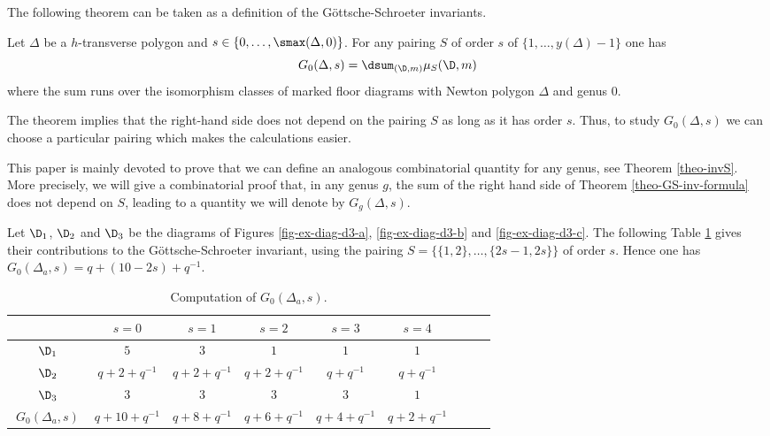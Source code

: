 The following theorem can be taken as a definition of the Göttsche-Schroeter invariants.

\begin{theo}\label{theo-GS-inv-formula}
Let $\Delta$ be a $h$-transverse polygon and $s\in \{0,\dots,\smax(\Delta,0)\}$. For any pairing $S$ of order $s$ of $\{1,\dots, y(\Delta)-1 \}$ one has
\[ G_0(\Delta,s) = \dsum_{(\D,m)} \mu_S(\D,m)  \]
where the sum runs over the isomorphism classes of marked floor diagrams with Newton polygon $\Delta$ and genus $0$.
\end{theo}

\begin{rema}
The theorem implies that the right-hand side does not depend on the pairing $S$ as long as it has order $s$. Thus, to study $G_0(\Delta,s)$ we can choose a particular pairing which makes the calculations easier.

This paper is mainly devoted to prove that we can define an analogous combinatorial quantity for any genus, see Theorem \ref{theo-invS}. More precisely, we will give a combinatorial proof that, in any genus $g$, the sum of the right hand side of Theorem \ref{theo-GS-inv-formula} does not depend on $S$, leading to a quantity we will denote by $G_g(\Delta,s)$.
\end{rema}


\begin{exam} \label{ex-calcul-G0-Delta3}
    Let $\D_1$, $\D_2$ and $\D_3$ be the diagrams of Figures \ref{fig-ex-diag-d3-a}, \ref{fig-ex-diag-d3-b} and \ref{fig-ex-diag-d3-c}. The following Table \ref{table-ex-refined-inv} gives their contributions to the Göttsche-Schroeter invariant, using the pairing $S = \{\{1,2\},\dots,\{2s-1,2s\}\}$ of order $s$. Hence one has $G_0(\Delta_a,s) = q+(10-2s)+q^{-1}$.

\begin{table}[ht]
\renewcommand{\arraystretch}{1.5}
\centering
\begin{tabular}{|c||c|c|c|c|c|c|c|c|}
\hline 
 & $s=0$ & $s=1$ & $s=2$ & $s=3$ & $s=4$ \\
 \hline
 \hline
$\ \D_1\ $ & $5$ & $3$ & $1$ & $1$ & $1$ \\
\hline 
$\ \D_2\ $ & $q+2+q^{-1}$ & $q+2+q^{-1}$ & $q+2+q^{-1}$ & $q+q^{-1}$ & $q+q^{-1}$  \\
\hline
$\ \D_3\ $ & $3$ & $3$ & $3$ & $3$ & $1$ \\
\hline 
 \hline
$\ G_0(\Delta_a,s) \ $ & $q+10+q^{-1}$ & $q+8+q^{-1}$ & $q+6+q^{-1}$ & $q+4+q^{-1}$ & $q+2+q^{-1}$ \\
\hline 
\end{tabular}
\caption{Computation of $G_0(\Delta_a,s)$.}
\label{table-ex-refined-inv}
\end{table}
\end{exam}

